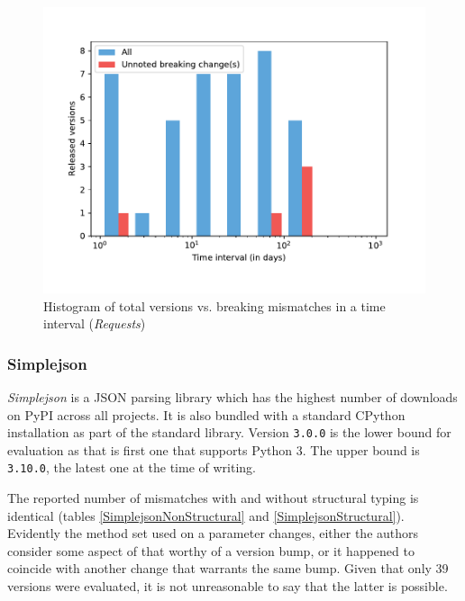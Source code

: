 \documentclass{l4proj}
\newcommand\genericstyle{\lstset{basicstyle=\ttm}}
\newcommand\codeinline[1]{{\genericstyle\lstinline!#1!}}
\begin{document}
\begin{figure}[]
\centering
\includegraphics[height=0.4\textheight]{images/evaluation/requests_introduced_changes}
\caption{Histogram of total versions vs. breaking mismatches in a time
interval (\textit{Requests})}
\label{RequestsHistogram}
\end{figure}

\subsubsection{Simplejson}

\textit{Simplejson} is a JSON parsing library which has the highest
number of downloads on PyPI across all projects. It is also bundled
with a standard CPython installation as part of the standard library.
Version \codeinline{3.0.0} is the lower bound for evaluation as that
is first one that supports Python 3. The upper bound is
\codeinline{3.10.0}, the latest one at the time of writing.

The reported number of mismatches with and without structural typing
is identical (tables \ref{SimplejsonNonStructural} and
\ref{SimplejsonStructural}). Evidently the method set used on a
parameter changes, either the authors consider some aspect of that
worthy of a version bump, or it happened to coincide with another
change that warrants the same bump. Given that only 39 versions were
evaluated, it is not unreasonable to say that the latter is possible.
\end{document}
